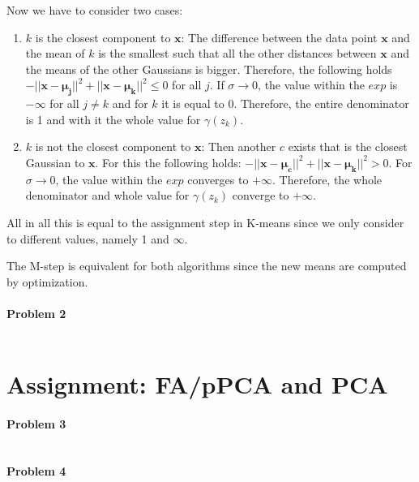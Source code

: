 \documentclass{article}
\renewcommand{\Vec}[1]{\ensuremath{\mathbf{#1}}}
\begin{document}
Now we have to consider two cases:
\begin{enumerate}
\item $k$ is the closest component to $\Vec{x}$: The difference between the data point $\Vec{x}$ and the mean of $k$ is the smallest such that all the other distances between $\Vec{x}$ and the means of the other Gaussians is bigger. Therefore, the following holds $-||\Vec{x}-\Vec{\mu_j}||^2 + ||\Vec{x}-\Vec{\mu_k}||^2 \leq 0$ for all $j$. If $\sigma \rightarrow 0$, the value within the $exp$ is $-\infty$ for all $j \neq k$ and for $k$ it is equal to 0. Therefore, the entire denominator is 1 and with it the whole value for $\gamma(z_k)$.
\item $k$ is not the closest component to $\Vec{x}$: Then another $c$ exists that is the closest Gaussian to $\Vec{x}$. For this the following holds: $-||\Vec{x}-\Vec{\mu_c}||^2 + ||\Vec{x}-\Vec{\mu_k}||^2 > 0$. For $\sigma \rightarrow 0$, the value within the $exp$ converges to $+\infty$. Therefore, the whole denominator and whole value for $\gamma(z_k)$ converge to $+\infty$.
\end{enumerate}

All in all this is equal to the assignment step in K-means since we only consider to different values, namely 1 and $\infty$.

The M-step is equivalent for both algorithms since the new means are computed by optimization.
 

\paragraph*{Problem 2}
$\;$ 



\section{Assignment: FA/pPCA and PCA}
\paragraph*{Problem 3}
$\;$



\paragraph*{Problem 4}
$\;$ 
\end{document}

